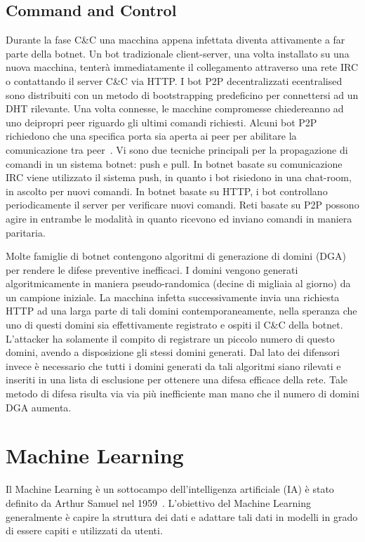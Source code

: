 \subsection{Command and Control}
Durante la fase C\&C una macchina appena infettata diventa attivamente a far parte della botnet. Un bot tradizionale client-server, una volta installato su una nuova macchina, tenterà immediatamente il collegamento attraverso una rete IRC o contattando il server C\&C via HTTP.
I bot P2P decentralizzati ecentralised sono distribuiti con un metodo di bootstrapping predeficino per connettersi ad un DHT rilevante. Una volta connesse, le macchine compromesse chiedereanno ad uno deipropri peer riguardo gli ultimi comandi richiesti. Alcuni bot P2P richiedono che una specifica porta sia aperta ai peer per abilitare la comunicazione tra peer~\cite{p2pbots}. 
Vi sono due tecniche principali per la propagazione di comandi in un sistema botnet: push e pull.
In botnet basate su comunicazione IRC viene utilizzato il sistema push, in quanto i bot risiedono in una chat-room, in ascolto per nuovi comandi. 
In botnet basate su HTTP, i bot controllano periodicamente il server per verificare nuovi comandi. 
Reti basate su P2P possono agire in entrambe le modalità in quanto ricevono ed inviano comandi in maniera paritaria.


Molte famiglie di botnet contengono algoritmi di generazione di domini (DGA) per rendere le difese preventive inefficaci. I domini vengono generati algoritmicamente in maniera pseudo-randomica (decine di migliaia al giorno) da un campione iniziale. La macchina infetta successivamente invia una richiesta HTTP ad una larga parte di tali domini contemporaneamente, nella speranza che uno di questi domini sia effettivamente registrato e ospiti il C\&C della botnet. L'attacker ha solamente il compito di registrare un piccolo numero di questo domini, avendo a disposizione gli stessi domini generati. Dal lato dei difensori invece è necessario che tutti i domini generati da tali algoritmi siano rilevati e inseriti in una lista di esclusione per ottenere una difesa efficace della rete. Tale metodo di difesa risulta via via più inefficiente man mano che il numero di domini DGA aumenta.

\newpage
\section{Machine Learning}
\label{sec:machinelearning}
Il Machine Learning è un sottocampo dell'intelligenza artificiale (IA) è stato definito da Arthur Samuel nel 1959~\cite{5392560}. L'obiettivo del Machine Learning generalmente è capire la struttura dei dati e adattare tali dati in modelli in grado di essere capiti e utilizzati da utenti.

